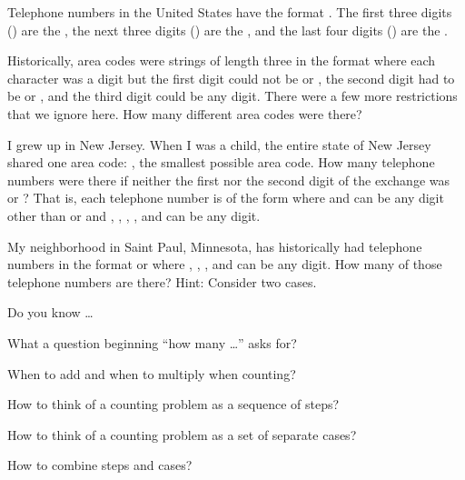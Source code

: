 \begin{exer} [\exerU] %
\label{exer_phone_numbers}
Telephone numbers in the United States have the format . The first three digits () are the , the next three digits () are the , and the last four digits () are the . 
    \begin{exerpart}
        \item Historically, area codes were strings of length three in the format  where each character was a digit but the first digit  could not be  or , the second digit  had to be  or , and the third digit  could be any digit.  There were a few more restrictions that we ignore here.  How many different area codes were there?
        \item I grew up in New Jersey.  When I was a child, the entire state of New Jersey shared one area code: , the smallest possible area code. How many  telephone numbers were there if neither the first nor the second digit of the exchange was  or ? That is, each telephone number is of the form  where  and  can be any digit other than  or  and , , , , and  can be any digit.
        \item My neighborhood in Saint Paul, Minnesota, has historically had telephone numbers in the format  or  where , , , and  can be any digit.  How many of those telephone numbers are there?  Hint: Consider two cases.
    \end{exerpart}
\end{exer}

\begin{exer}[\exerR] %
\label{exer_dyk_steps_cases}
    Do you know \ldots
        \begin{exerpart}
            \item What a question beginning ``how many \ldots'' asks for?
            \item When to add and when to multiply when counting?  
            \item How to think of a counting problem as a sequence of steps?
            \item How to think of a counting problem as a set of separate cases?
            \item How to combine steps and cases?
        \end{exerpart}
\end{exer}


